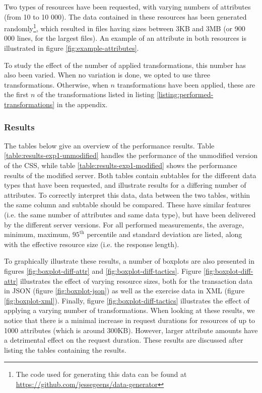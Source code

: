 \noindent Two types of resources have been requested, with varying numbers of attributes (from 10 to 10 000). The data contained in these resources has been generated randomly\footnote{The code used for generating this data can be found at \url{https://github.com/jessegeens/data-generator}}, which resulted in  files having sizes between 3KB and 3MB (or 900 000 lines, for the largest files). An example of an attribute in both resources is illustrated in figure \ref{fig:example-attributes}.

To study the effect of the number of applied transformations, this number has also been varied. When no variation is done, we opted to use three transformations. Otherwise, when $n$ transformations have been applied, these are the first $n$ of the transformations listed in listing \ref{listing:performed-transformations} in the appendix.

\subsubsection{Results}
The tables below give an overview of the performance results. Table \ref{table:results-exp1-unmodified} handles the performance of the unmodified version of the \gls{CSS}, while table \ref{table:results-exp1-modified} shows the performance results of the modified server. Both tables contain subtables for the different data types that have been requested, and illustrate results for a differing number of attributes. 
To correctly interpret this data, data between the two tables, within the same column and subtable should be compared. These have similar features (i.e. the same number of attributes and same data type), but have been delivered by the different server versions. For all performed measurements, the average, minimum, maximum, $95^{\text{th}}$ percentile and standard deviation are listed, along with the effective resource size (i.e. the response length).

To graphically illustrate these results, a number of boxplots are also presented in figures \ref{fig:boxplot-diff-attr} and \ref{fig:boxplot-diff-tactics}. Figure \ref{fig:boxplot-diff-attr} illustrates the effect of varying resource sizes, both for the transaction data in JSON (figure \ref{fig:boxplot-json}) as well as the exercise data in XML (figure \ref{fig:boxplot-xml}). Finally, figure \ref{fig:boxplot-diff-tactics} illustrates the effect of applying a varying number of transformations. When looking at these results, we notice that there is a minimal increase in request durations for resources of up to 1000 attributes (which is around 300KB). However, larger attribute amounts have a detrimental effect on the request duration. These results are discussed after listing the tables containing the results.

